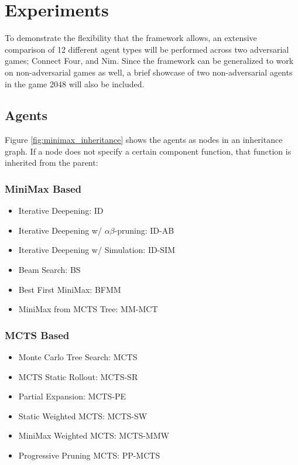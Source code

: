 \section{Experiments}

To demonstrate the flexibility that the framework allows, an extensive comparison of 12 different agent types will be performed across two
adversarial games; Connect Four, and Nim. Since the framework can be generalized to work on non-adversarial games as well, a brief showcase of two non-adversarial agents in the game 2048 will also be included.

\subsection{Agents}

Figure \ref{fig:minimax_inheritance} shows the agents as nodes in an inheritance graph. If a node does not specify a certain component function, that function is inherited from the parent:



\subsubsection{MiniMax Based}
\begin{itemize}
    \item Iterative Deepening: ID
    \item Iterative Deepening w/ $\alpha\beta$-pruning: ID-AB
    \item Iterative Deepening w/ Simulation: ID-SIM
    \item Beam Search: BS
    \item Best First MiniMax: BFMM
    \item MiniMax from MCTS Tree: MM-MCT
\end{itemize}

\subsubsection{MCTS Based}
\begin{itemize}
    \item Monte Carlo Tree Search: MCTS
    \item MCTS Static Rollout: MCTS-SR
    \item Partial Expansion: MCTS-PE
    \item Static Weighted MCTS: MCTS-SW
    \item MiniMax Weighted MCTS: MCTS-MMW
    \item Progressive Pruning MCTS: PP-MCTS
\end{itemize}

